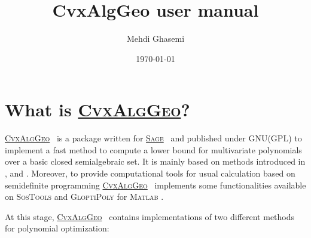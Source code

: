\documentclass{amsart}
\theoremstyle{definition}
\newcommand{\sage}{\href{http://www.sagemath.org}{\textsc{Sage}}}
\newcommand{\cvxalggeo}{\href{https://github.com/mghasemi/CvxAlgGeo}{\textsc{CvxAlgGeo}}}
\begin{document}
\title{CvxAlgGeo user manual}
%
\author[M. Ghasemi]{Mehdi Ghasemi}
%
\address{Department of Mathematics and Statistics,\newline\indent
University of Saskatchewan,\newline\indent
Saskatoon, SK. S7N 5E6, Canada}
%
%
%


\date{\today}


\maketitle


\section{What is \cvxalggeo?}

\cvxalggeo~ is a package written for \sage~ and published under GNU(GPL) to implement a fast method to compute a lower bound for multivariate 
polynomials over a basic closed semialgebraic set. It is mainly based on methods introduced in \cite{lbgp}, \cite{lbgpLasserre} and \cite{genlbgp}. 
Moreover, to provide computational tools for usual calculation based on semidefinite programming \cvxalggeo~ implements some functionalities 
available on \textsc{SosTools} and \textsc{GloptiPoly} for \textsc{Matlab} \cite{gloptipoly, sostools}.

At this stage, \cvxalggeo~ contains implementations of two different methods for polynomial optimization:
\end{document}
